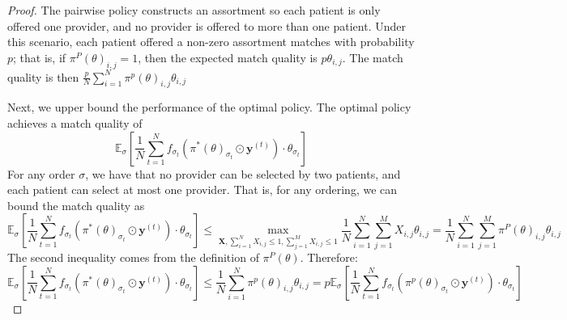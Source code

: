 \thmlp*
\begin{proof}
    The pairwise policy constructs an assortment so each patient is only offered one provider, and no provider is offered to more than one patient. 
    Under this scenario, each patient offered a non-zero assortment matches with probability $p$; that is, if $\pi^{P}(\theta)_{i,j}=1$, then the expected match quality is $p \theta_{i,j}$. 
    The match quality is then $\frac{p}{N} \sum_{i=1}^{N} \pi^{p}(\theta)_{i,j} \theta_{i,j}$

    Next, we upper bound the performance of the optimal policy.
    The optimal policy achieves a match quality of 
    \begin{equation}
        \mathbb{E}_{\sigma}[\frac{1}{N} \sum_{t=1}^{N} f_{\sigma_{t}}\left(\pi^{*}(\theta)_{\sigma_{t}} \odot \mathbf{y}^{(t)}\right)  \cdot \theta_{\sigma_{t}}]
    \end{equation}
    For any order $\sigma$, we have that no provider can be selected by two patients, and each patient can select at most one provider. 
    That is, for any ordering, we can bound the match quality as 
    \begin{equation}
        \mathbb{E}_{\sigma}[\frac{1}{N} \sum_{t=1}^{N} f_{\sigma_{t}}\left(\pi^{*}(\theta)_{\sigma_{t}} \odot \mathbf{y}^{(t)}\right)  \cdot \theta_{\sigma_{t}}] \leq \max\limits_{\mathbf{X}, \sum_{i=1}^{N} X_{i,j} \leq 1, \sum_{j=1}^{M} X_{i,j} \leq 1} \frac{1}{N} \sum_{i=1}^{N} \sum_{j=1}^{M} X_{i,j} \theta_{i,j} = \frac{1}{N} \sum_{i=1}^{N} \sum_{j=1}^{M} \pi^{P}(\theta)_{i,j} \theta_{i,j}
    \end{equation}
    The second inequality comes from the definition of $\pi^{P}(\theta)$. 
    Therefore: 
    \begin{equation}
        \mathbb{E}_{\sigma}[\frac{1}{N} \sum_{t=1}^{N} f_{\sigma_{t}}\left(\pi^{*}(\theta)_{\sigma_{t}} \odot \mathbf{y}^{(t)}\right)  \cdot \theta_{\sigma_{t}}] \leq \frac{1}{N} \sum_{i=1}^{N} \pi^{p}(\theta)_{i,j} \theta_{i,j} =  p \mathbb{E}_{\sigma}[\frac{1}{N} \sum_{t=1}^{N} f_{\sigma_{t}}\left(\pi^{p}(\theta)_{\sigma_{t}} \odot \mathbf{y}^{(t)}\right)  \cdot \theta_{\sigma_{t}}]
    \end{equation}
\end{proof}

\thmgroupingmatch*

